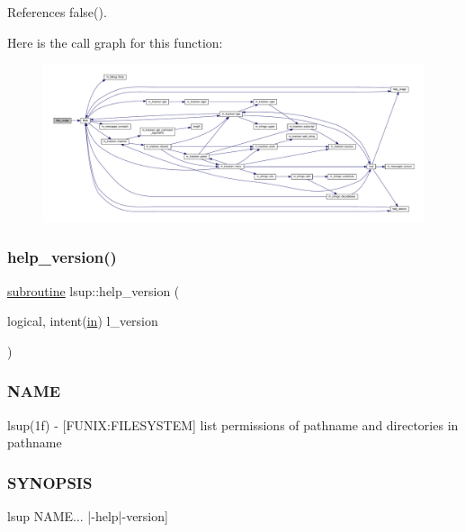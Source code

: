 References false().

Here is the call graph for this function\+:
\nopagebreak
\begin{figure}[H]
\begin{center}
\leavevmode
\includegraphics[width=350pt]{lsup_8f90_ace9719243d0fef42bc7f2aa8094892ee_cgraph}
\end{center}
\end{figure}
\mbox{\label{lsup_8f90_a7566fe8ce05250d40d981110b710d428}} 
\subsubsection{\texorpdfstring{help\+\_\+version()}{help\_version()}}
{\footnotesize\ttfamily \hyperlink{M__stopwatch_83_8txt_acfbcff50169d691ff02d4a123ed70482}{subroutine} lsup\+::help\+\_\+version (\begin{DoxyParamCaption}\item[{logical, intent(\hyperlink{M__journal_83_8txt_afce72651d1eed785a2132bee863b2f38}{in})}]{l\+\_\+version }\end{DoxyParamCaption})}



\subsubsection*{N\+A\+ME}

lsup(1f) -\/ \mbox{[}F\+U\+N\+IX\+:F\+I\+L\+E\+S\+Y\+S\+T\+EM\mbox{]} list permissions of pathname and directories in pathname 

\subsubsection*{S\+Y\+N\+O\+P\+S\+IS}

\begin{DoxyVerb}lsup NAME... |-help|-version]
\end{DoxyVerb}


